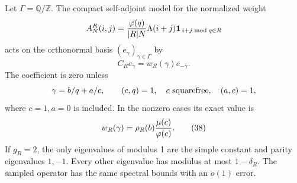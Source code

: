 \begin{lemma}
\label{lem:filtermodel}
Let \(\Gamma=\mathbb Q/\mathbb Z\).
The compact self-adjoint model for the normalized weight
\[
 A_N^R(i,j)=\frac{\varphi(q)}{|R|N}
                     \Lambda(i+j)\mathbf1_{\,i+j\bmod q\in R}
\]
acts on the orthonormal basis \((e_\gamma)_{\gamma\in\Gamma}\) by
\[
 C_Re_\gamma=w_R(\gamma)e_{-\gamma}.
 \tag{37}
\]
The coefficient is zero unless
\[
 \gamma=b/q+a/c,\qquad
 (c,q)=1,\quad c\ {\rm squarefree},\quad(a,c)=1,
\]
where \(c=1,a=0\) is included.
In the nonzero cases its exact value is
\[
 w_R(\gamma)=\rho_R(b)\frac{\mu(c)}{\varphi(c)}.                \tag{38}
\]
If \(g_R=2\), the only eigenvalues of modulus 1 are the simple
constant and parity eigenvalues \(1,-1\).
Every other eigenvalue has modulus at most \(1-\delta_R\).
The sampled operator has the same spectral bounds with an \(o(1)\)
error.
\end{lemma}
